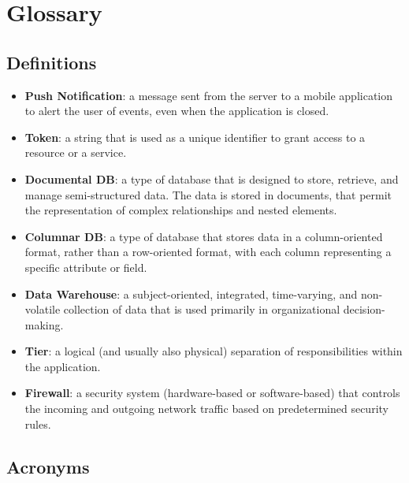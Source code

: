 \documentclass{Configuration_Files/PoliMi3i_thesis}
\begin{document}
\section{Glossary}

\subsection{Definitions}

\begin{itemize}
    \item \textbf{Push Notification}: a message sent from the server to a mobile application to alert the user of events, even when the application is closed.
    \item \textbf{Token}: a string that is used as a unique identifier to grant access to a resource or a service.
    \item \textbf{Documental DB}: a type of database that is designed to store, retrieve, and manage semi-structured data. The data is stored in documents, that permit the representation of complex relationships and nested elements.
    \item \textbf{Columnar DB}: a type of database that stores data in a column-oriented format, rather than a row-oriented format, with each column representing a specific attribute or field.
    \item \textbf{Data Warehouse}: a subject-oriented, integrated, time-varying, and non-volatile collection of data that is used primarily in organizational decision-making.
    \item \textbf{Tier}: a logical (and usually also physical) separation of responsibilities within the application.
    \item \textbf{Firewall}: a security system (hardware-based or software-based) that controls the incoming and outgoing network traffic based on predetermined security rules.
\end{itemize}

\subsection{Acronyms}
\end{document}
